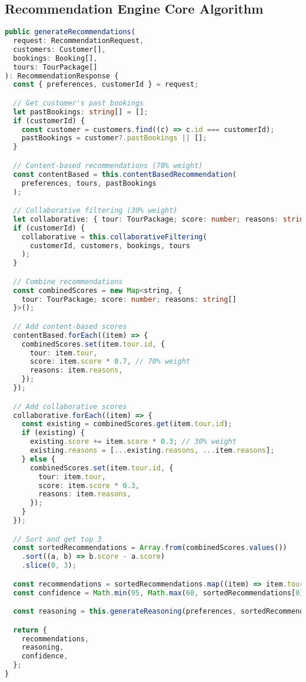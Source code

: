 \documentclass[12pt,a4paper]{article}
\begin{document}
\subsection{Recommendation Engine Core Algorithm}
\begin{lstlisting}[language=typescript, caption=Complete Recommendation Generation Method]
public generateRecommendations(
  request: RecommendationRequest,
  customers: Customer[],
  bookings: Booking[],
  tours: TourPackage[]
): RecommendationResponse {
  const { preferences, customerId } = request;

  // Get customer's past bookings
  let pastBookings: string[] = [];
  if (customerId) {
    const customer = customers.find((c) => c.id === customerId);
    pastBookings = customer?.pastBookings || [];
  }

  // Content-based recommendations (70% weight)
  const contentBased = this.contentBasedRecommendation(
    preferences, tours, pastBookings
  );

  // Collaborative filtering (30% weight)
  let collaborative: { tour: TourPackage; score: number; reasons: string[] }[] = [];
  if (customerId) {
    collaborative = this.collaborativeFiltering(
      customerId, customers, bookings, tours
    );
  }

  // Combine recommendations
  const combinedScores = new Map<string, { 
    tour: TourPackage; score: number; reasons: string[] 
  }>();

  // Add content-based scores
  contentBased.forEach((item) => {
    combinedScores.set(item.tour.id, {
      tour: item.tour,
      score: item.score * 0.7, // 70% weight
      reasons: item.reasons,
    });
  });

  // Add collaborative scores
  collaborative.forEach((item) => {
    const existing = combinedScores.get(item.tour.id);
    if (existing) {
      existing.score += item.score * 0.3; // 30% weight
      existing.reasons = [...existing.reasons, ...item.reasons];
    } else {
      combinedScores.set(item.tour.id, {
        tour: item.tour,
        score: item.score * 0.3,
        reasons: item.reasons,
      });
    }
  });

  // Sort and get top 3
  const sortedRecommendations = Array.from(combinedScores.values())
    .sort((a, b) => b.score - a.score)
    .slice(0, 3);

  const recommendations = sortedRecommendations.map((item) => item.tour);
  const confidence = Math.min(95, Math.max(60, sortedRecommendations[0]?.score || 0));

  const reasoning = this.generateReasoning(preferences, sortedRecommendations);

  return {
    recommendations,
    reasoning,
    confidence,
  };
}
\end{lstlisting}
\end{document}
